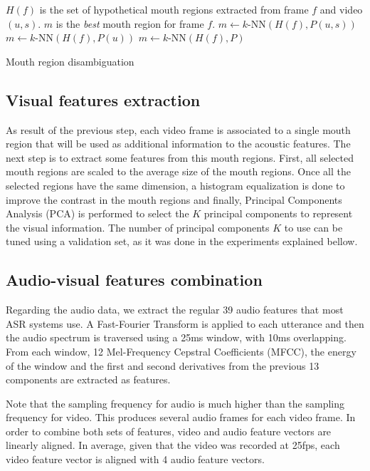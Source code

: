 \documentclass[12pt,a4paper]{article}
\begin{document}
\begin{algorithm}
\begin{algorithmic}
\Require $H(f)$ is the set of hypothetical mouth regions extracted from frame $f$ and video $(u,s)$.
\Ensure $m$ is the \emph{best} mouth region for frame $f$.
 
\State $m \leftarrow k\text{-NN}(H(f), P(u,s))$
 
\State $m \leftarrow k\text{-NN}(H(f), P(u))$
\Else {}
\State $m \leftarrow k\text{-NN}(H(f), P)$
\EndIf
\end{algorithmic}
\caption{Mouth region disambiguation}
\label{alg:mouth_disambiguation}
\end{algorithm}

\subsection{Visual features extraction}
As result of the previous step, each video frame is associated to a single mouth region that will be used as additional information to the acoustic features. The next step is to extract some features from this mouth regions. First, all selected mouth regions are scaled to the average size of the mouth regions. Once all the selected regions have the same dimension, a histogram equalization is done to improve the contrast in the mouth regions and finally, Principal Components Analysis (PCA) is performed to select the $K$ principal components to represent the visual information. The number of principal components $K$ to use can be tuned using a validation set, as it was done in the experiments explained bellow.

\subsection{Audio-visual features combination}
Regarding the audio data, we extract the regular 39 audio features that most ASR systems use. A Fast-Fourier Transform is applied to each utterance and then the audio spectrum is traversed using a 25ms window, with 10ms overlapping. From each window, 12 Mel-Frequency Cepstral Coefficients (MFCC), the energy of the window and the first and second derivatives from the previous 13 components are extracted as features.

Note that the sampling frequency for audio is much higher than the sampling frequency for video. This produces several audio frames for each video frame. In order to combine both sets of features, video and audio feature vectors are linearly aligned. In average, given that the video was recorded at 25fps, each video feature vector is aligned with 4 audio feature vectors.
\end{document}
